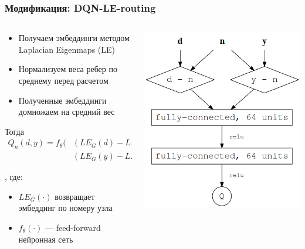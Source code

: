 \documentclass{beamer}
\begin{document}

\begin{frame}
  \frametitle{Модификация: DQN-LE-routing}
  \begin{columns}
    \begin{column}{0.6\textwidth}
      \begin{itemize}
      \item Получаем эмбеддинги методом Laplacian Eigenmaps (LE)
      \item Нормализуем веса ребер по среднему перед расчетом
      \item Полученные эмбеддинги домножаем на средний вес
      \end{itemize}

      Тогда
      \begin{align*}
        Q_n(d, y) = f_{\theta}( &(LE_G(d) - LE_G(n)) \odot \\
                             &(LE_G(y) - LE_G(n)))
      \end{align*}

      , где:
      \begin{itemize}
      \item $LE_G(\cdot)$ возвращает эмбеддинг по номеру узла
      \item $f_{\theta}(\cdot)$ --- feed-forward нейронная сеть
      \end{itemize}
    \end{column}
    \begin{column}{0.4\textwidth}
      \begin{center}
        \includegraphics[width=\textwidth]{nn-1-one-out.png}
      \end{center}
    \end{column}
  \end{columns}
\end{frame}
\end{document}
